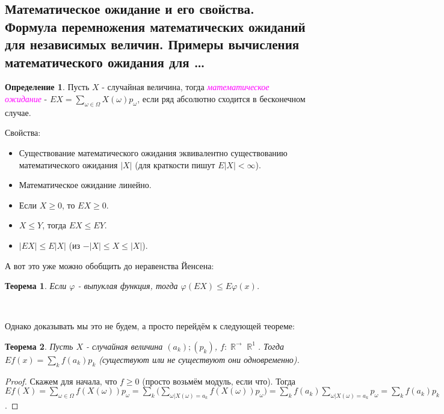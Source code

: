 \documentclass[a4paper,100pt]{article}
\theoremstyle{indented}
\newtheorem{theorem}{Теорема}
\theoremstyle{definition}
\newtheorem{defn}{Определение}
\theoremstyle{remark}
\DeclareMathOperator{\RR}{\mathbb{R}}
\begin{document}
\subsection{Математическое ожидание и его свойства. Формула перемножения математических ожиданий для независимых величин. Примеры вычисления математического ожидания для \ldots} 

\begin{defn}
  Пусть $X$ - случайная величина, тогда \hypertarget{n13}{\textcolor{magenta}{\textit{математическое ожидание}}} - $EX = \sum_{\omega \in \Omega} X(\omega)p_\omega$, если ряд абсолютно сходится в бесконечном случае.
\end{defn}

Свойства: \\ 

\begin{itemize}
  \item Существование математического ожидания эквивалентно существованию математического ожидания $|X|$ (для краткости пишут $E|X|<\infty$). 
  \item Математическое ожидание линейно.
  \item Если $X\geq 0$, то $EX\geq 0$. 
  \item $X\leq Y$, тогда $EX\leq EY$. 
  \item $|EX|\leq E|X|$ (из $-|X|\leq X \leq |X|$). 
\end{itemize}

А вот это уже можно обобщить до неравенства Йенсена: \\

\begin{theorem}
    Если $\varphi$ - выпуклая функция, тогда $\varphi(EX)\leq E\varphi(x)$. 
\end{theorem} \

Однако доказывать мы это не будем, а просто перейдём к следующей теореме: \\

\begin{theorem}
    Пусть $X$ - случайная величина $(a_k); (p_k)$, $f:\RR^\rightarrow \RR^1$. Тогда $Ef(x)=\sum_k f(a_k)p_k$ (существуют или не существуют они одновременно). 
\end{theorem}

\begin{proof}
    Скажем для начала, что $f\geq 0$ (просто возьмём модуль, если что). Тогда $E f(X)=\sum_{\omega \in \Omega} f(X(\omega))p_\omega = \sum_k \biggl( \sum_{\omega|X(\omega) = a_k} f(X(\omega)) p_\omega\biggr) = \sum_k f(a_k) \sum_{\omega | X(\omega)=a_k}p_\omega = \sum_k f(a_k)p_k$. 
\end{proof}
\end{document}
